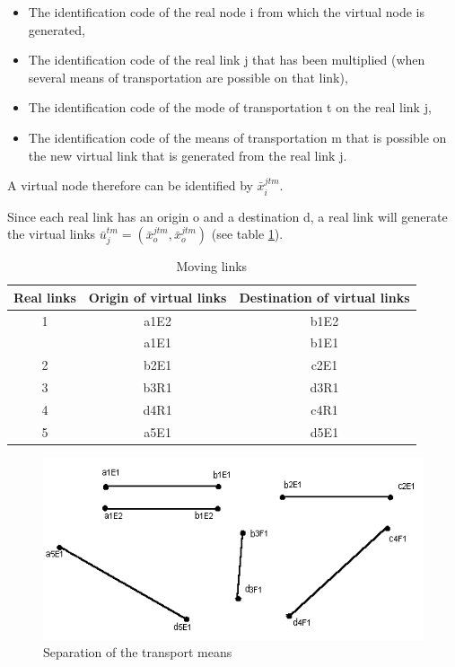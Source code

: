 \begin{itemize}

\item  The identification code of the real node i from which the virtual node
is generated,

\item  The identification code of the real link j that has been multiplied (when
several means of transportation are possible on that link),

\item  The identification code of the mode of transportation t on the real link j,

\item  The identification code of the means of transportation m that is possible
on the new virtual link that is generated from the real link j.
\end{itemize}


A virtual node therefore can be identified by $\bar x_i^{jtm}$.

Since each real link has an origin o and a destination d, a real link will
generate the virtual links $\bar u_j^{tm}=(\bar x_o^{jtm},\bar x_o^{jtm})$ (see
table \ref{tab3_2}).


\begin{table}[htbp]
\begin{center}
\begin{tabular}{ccc}
\hline
Real links & Origin of virtual links & Destination of virtual links \\

\hline
1 & a1E2 & b1E2\\

  & a1E1 & b1E1\\

2 & b2E1 & c2E1\\

3 & b3R1 & d3R1\\

4 & d4R1 & c4R1\\

5 & a5E1 & d5E1\\
\hline
\end{tabular}
\caption{\label{tab3_2} Moving links}
\end{center}
\end{table}

\begin{figure}[htbp]
\centerline{\includegraphics[width=12cm]{f3_4.png}}
\caption{\label{f3_4} Separation of the transport means}
\end{figure}


